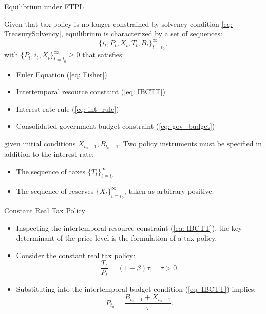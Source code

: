 \documentclass[11pt,aspectratio=169]{beamer}
\begin{document}
\begin{frame}{Equilibrium under FTPL}


Given that tax policy is no longer constrained by solvency condition \eqref{eq: TreasurySolvency}, equilibrium is characterized by a set of sequences:
\[
\{ i_t, P_t, X_t, T_t, B_t \}_{t=t_0}^\infty,
\]
with $\{P_t, i_t, X_t \}_{t=t_0}^\infty \geq 0$ that satisfies:
\begin{itemize}
  \item Euler Equation (\ref{eq: Fisher})
  \item Intertemporal resource constaint (\ref{eq: IBCTT})
  \item Interest-rate rule (\ref{eq: int_rule})
  \item Consolidated government budget constraint (\ref{eq: gov_budget})
\end{itemize}

given initial conditions $X_{t_0-1}, B_{t_0-1}$.  
\vspace{0.3cm}
\break
Two policy instruments must be specified in addition to the interest rate:
\begin{itemize}
  \item The sequence of taxes $\{T_t\}_{t=t_0}^\infty$
  \item The sequence of reserves $\{X_t\}_{t=t_0}^\infty$, taken as arbitrary positive.
\end{itemize}

\end{frame}

\begin{frame}{Constant Real Tax Policy}
\begin{itemize}
    \item Inspecting the intertemporal resource constraint (\ref{eq: IBCTT}), the key determinant of the price level is the formulation of a tax policy.
    \vspace{0.25cm}
\item Consider the constant real tax policy:
    \begin{equation} \label{tax_policy}
    \frac{T_t}{P_t} = (1-\beta)\tau, \quad \tau>0.        
    \end{equation}
    \vspace{0.25cm}
    \item Substituting into the intertemporal budget condition (\ref{eq: IBCTT}) implies:
    \begin{equation} \label{Price_Level}
     P_{t_0} = \frac{B_{t_0-1} + X_{t_0-1}}{\tau}.
    \end{equation}
\end{itemize}
\end{frame}
\end{document}
